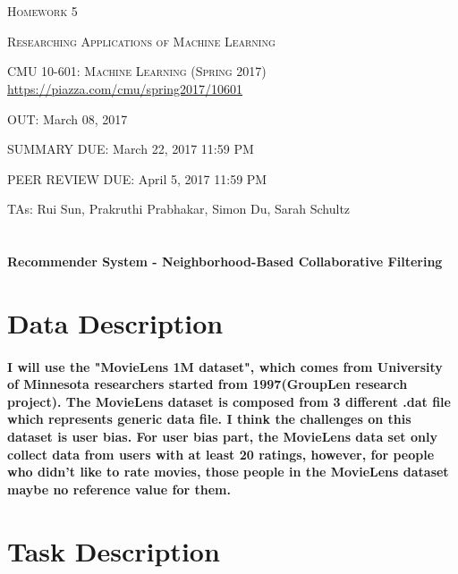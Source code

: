 \documentclass{article}
\begin{document}
\section*{}
\begin{center}
  \centerline{\textsc{\LARGE Homework 5}}
  \vspace{0.5em}
  \centerline{\textsc{\Large Researching Applications of Machine Learning}}
  \vspace{1em}
  \textsc{\large CMU 10-601: Machine Learning (Spring 2017)} \\
  \url{https://piazza.com/cmu/spring2017/10601}
  \centerline{OUT: March 08, 2017}
  \centerline{SUMMARY DUE: March 22, 2017 11:59 PM}
  \centerline{PEER REVIEW DUE: April 5, 2017 11:59 PM} 
  \centerline{TAs: Rui Sun, Prakruthi Prabhakar, Simon Du, Sarah Schultz}

\end{center}



\section*{}
\begin{center}
\centerline{\textbf{\Large Recommender System - Neighborhood-Based Collaborative Filtering}}
\end{center}
\section{Data Description}
\paragraph{I will use the "MovieLens 1M dataset", which comes from University of Minnesota researchers started from 1997(GroupLen research project). The MovieLens dataset is composed from 3 different .dat file which represents generic data file. I think the challenges on this dataset is user bias. For user bias part, the MovieLens data set only collect data from users with at least 20 ratings, however, for people who didn't like to rate movies, those people in the MovieLens dataset maybe no reference value for them.
}

\section{Task Description}
\end{document}
